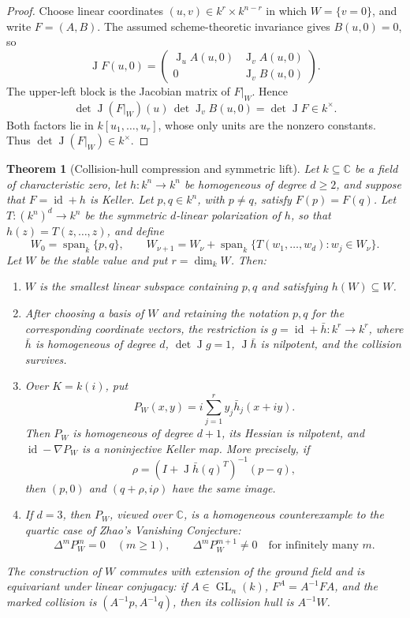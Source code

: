 \documentclass[11pt]{article}
\newtheorem{theorem}{Theorem}
\theoremstyle{remark}
\DeclareMathOperator{\J}{J}
\newcommand{\C}{\mathbb{C}}
\newcommand{\id}{\operatorname{id}}
\begin{document}
\begin{proof}
Choose linear coordinates $(u,v)\in k^r\times k^{n-r}$ in which $W=\{v=0\}$, and write $F=(A,B)$. The assumed scheme-theoretic invariance gives $B(u,0)=0$, so
\[
\J F(u,0)=
\begin{pmatrix}
\J_uA(u,0)&\J_vA(u,0)\\
0&\J_vB(u,0)
\end{pmatrix}.
\]
The upper-left block is the Jacobian matrix of $F|_W$. Hence
\[
\det\J(F|_W)(u)\,\det\J_vB(u,0)=\det\J F\in k^\times.
\]
Both factors lie in $k[u_1,\ldots,u_r]$, whose only units are the nonzero constants. Thus $\det\J(F|_W)\in k^\times$.
\end{proof}

\begin{theorem}[Collision-hull compression and symmetric lift]\label{thm:collision-hull}
Let $k\subseteq\C$ be a field of characteristic zero, let $h\colon k^n\to k^n$ be homogeneous of degree $d\ge2$, and suppose that $F=\id+h$ is Keller. Let $p,q\in k^n$, with $p\ne q$, satisfy $F(p)=F(q)$. Let $T\colon(k^n)^d\to k^n$ be the symmetric $d$-linear polarization of $h$, so that $h(z)=T(z,\ldots,z)$, and define
\begin{equation}\label{eq:collision-hull}
W_0=\operatorname{span}_k\{p,q\},\qquad
W_{\nu+1}=W_\nu+\operatorname{span}_k\{T(w_1,\ldots,w_d):w_j\in W_\nu\}.
\end{equation}
Let $W$ be the stable value and put $r=\dim_kW$. Then:
\begin{enumerate}[label=\arabic*.]
\item $W$ is the smallest linear subspace containing $p,q$ and satisfying $h(W)\subseteq W$.
\item After choosing a basis of $W$ and retaining the notation $p,q$ for the corresponding coordinate vectors, the restriction is $g=\id+\bar h\colon k^r\to k^r$, where $\bar h$ is homogeneous of degree $d$, $\det\J g=1$, $\J\bar h$ is nilpotent, and the collision survives.
\item Over $K=k(i)$, put
\begin{equation}\label{eq:symmetric-lift}
P_W(x,y)=i\sum_{j=1}^r y_j\bar h_j(x+iy).
\end{equation}
Then $P_W$ is homogeneous of degree $d+1$, its Hessian is nilpotent, and $\id-\nabla P_W$ is a noninjective Keller map. More precisely, if
\[
\rho=(I+\J\bar h(q)^T)^{-1}(p-q),
\]
then $(p,0)$ and $(q+\rho,i\rho)$ have the same image.
\item If $d=3$, then $P_W$, viewed over $\C$, is a homogeneous counterexample to the quartic case of Zhao's Vanishing Conjecture:
\[
\Delta^mP_W^m=0\quad(m\ge1),\qquad
\Delta^mP_W^{m+1}\ne0\quad\text{for infinitely many }m.
\]
\end{enumerate}
The construction of $W$ commutes with extension of the ground field and is equivariant under linear conjugacy: if $A\in\operatorname{GL}_n(k)$, $F^A=A^{-1}FA$, and the marked collision is $(A^{-1}p,A^{-1}q)$, then its collision hull is $A^{-1}W$.
\end{theorem}
\end{document}
